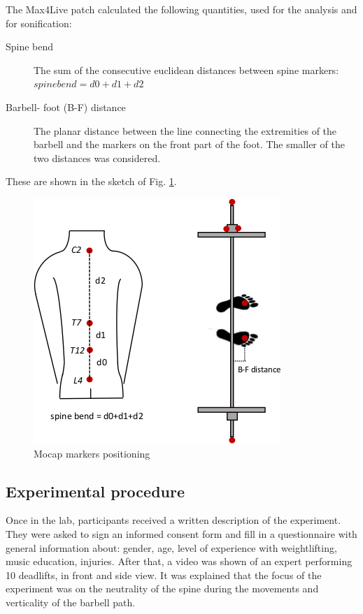 \documentclass[10pt,letterpaper]{article}
\begin{document}
The Max4Live patch calculated the following quantities, used for the analysis and for sonification: 
\begin{description}
\item[Spine bend] The sum of the consecutive euclidean distances between spine markers: $ spine bend = d0 + d1 + d2 $
\item[Barbell- foot (B-F) distance] The planar distance between the line connecting the extremities of the barbell and the markers on the front part of the foot. The smaller of the two distances was considered.
\end{description}
These are shown in the sketch of Fig. \ref{fig:sketch_quantities}.
\begin{figure}[!h]
\center
\includegraphics[width=.8\textwidth]{figures/Sketch_spine_final.jpg}
\caption{Mocap markers positioning}
\label{fig:sketch_quantities}      
\end{figure}



\subsection*{Experimental procedure}
Once in the lab, participants received a written description of the experiment. They were asked to sign an informed consent form and fill in a questionnaire with general information about: gender, age, level of experience with weightlifting, music education, injuries. After that, a video was shown of an expert performing 10 deadlifts, in front and side view. It was explained that the focus of the experiment was on the neutrality of the spine during the movements and verticality of the barbell path.
\end{document}
